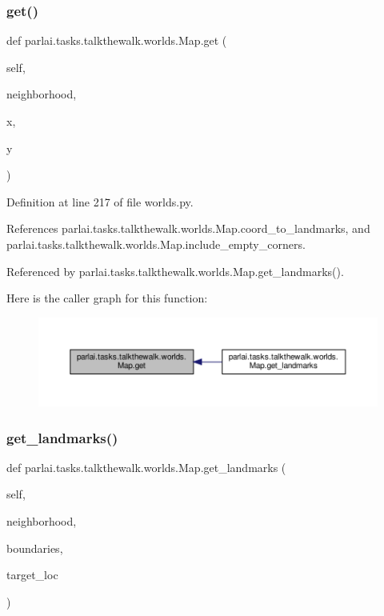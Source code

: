 \subsubsection{\texorpdfstring{get()}{get()}}
{\footnotesize\ttfamily def parlai.\+tasks.\+talkthewalk.\+worlds.\+Map.\+get (\begin{DoxyParamCaption}\item[{}]{self,  }\item[{}]{neighborhood,  }\item[{}]{x,  }\item[{}]{y }\end{DoxyParamCaption})}



Definition at line 217 of file worlds.\+py.



References parlai.\+tasks.\+talkthewalk.\+worlds.\+Map.\+coord\+\_\+to\+\_\+landmarks, and parlai.\+tasks.\+talkthewalk.\+worlds.\+Map.\+include\+\_\+empty\+\_\+corners.



Referenced by parlai.\+tasks.\+talkthewalk.\+worlds.\+Map.\+get\+\_\+landmarks().

Here is the caller graph for this function\+:
\nopagebreak
\begin{figure}[H]
\begin{center}
\leavevmode
\includegraphics[width=350pt]{classparlai_1_1tasks_1_1talkthewalk_1_1worlds_1_1Map_abb0b69a2cbaa77c9e422c0a7dc039974_icgraph}
\end{center}
\end{figure}
\mbox{\label{classparlai_1_1tasks_1_1talkthewalk_1_1worlds_1_1Map_af080964b1e6043ad8d6e1634932c82ca}} 
\subsubsection{\texorpdfstring{get\+\_\+landmarks()}{get\_landmarks()}}
{\footnotesize\ttfamily def parlai.\+tasks.\+talkthewalk.\+worlds.\+Map.\+get\+\_\+landmarks (\begin{DoxyParamCaption}\item[{}]{self,  }\item[{}]{neighborhood,  }\item[{}]{boundaries,  }\item[{}]{target\+\_\+loc }\end{DoxyParamCaption})}



